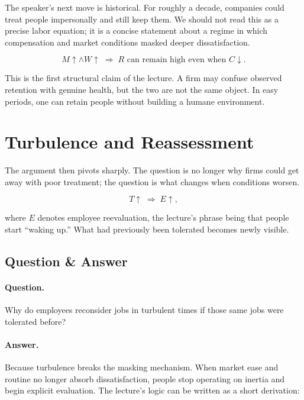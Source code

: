 The speaker's next move is historical. For roughly a decade, companies could treat people impersonally and still keep them. We should not read this as a precise labor equation; it is a concise statement about a regime in which compensation and market conditions masked deeper dissatisfaction.

\begin{equation}
M \uparrow \land W \uparrow \;\Rightarrow\; R \text{ can remain high even when } C \downarrow .
\end{equation}

This is the first structural claim of the lecture. A firm may confuse observed retention with genuine health, but the two are not the same object. In easy periods, one can retain people without building a humane environment.

\section{Turbulence and Reassessment}

The argument then pivots sharply. The question is no longer why firms could get away with poor treatment; the question is what changes when conditions worsen.

\begin{equation}
T \uparrow \;\Rightarrow\; E \uparrow ,
\end{equation}

where \(E\) denotes employee reevaluation, the lecture's phrase being that people start ``waking up.'' What had previously been tolerated becomes newly visible.

\subsection{Question \& Answer}

\paragraph{Question.} Why do employees reconsider jobs in turbulent times if those same jobs were tolerated before?

\paragraph{Answer.} Because turbulence breaks the masking mechanism. When market ease and routine no longer absorb dissatisfaction, people stop operating on inertia and begin explicit evaluation. The lecture's logic can be written as a short derivation:


